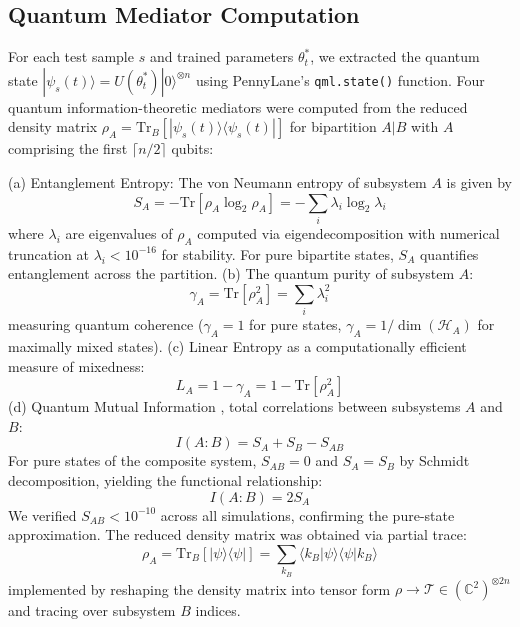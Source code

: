 \documentclass[
    reprint,
    amsmath, amssymb,
    aps,
    floatfix,
    nofootinbib
]{revtex4-1}
\begin{document}
\subsection*{Quantum Mediator Computation}

For each test sample $s$ and trained parameters $\theta_t^*$, we extracted the quantum state $|\psi_s(t)\rangle = U(\theta_t^*)|0\rangle^{\otimes n}$ using PennyLane's \texttt{qml.state()} function. Four quantum information-theoretic mediators were computed from the reduced density matrix $\rho_A = \text{Tr}_B[|\psi_s(t)\rangle\langle\psi_s(t)|]$ for bipartition $A|B$ with $A$ comprising the first $\lceil n/2 \rceil$ qubits:

(a) Entanglement Entropy: The von Neumann entropy of subsystem $A$ is given by 
\begin{equation}
S_A = -\text{Tr}[\rho_A \log_2 \rho_A] = -\sum_i \lambda_i \log_2 \lambda_i
\end{equation}
where $\lambda_i$ are eigenvalues of $\rho_A$ computed via eigendecomposition with numerical truncation at $\lambda_i < 10^{-16}$ for stability. For pure bipartite states, $S_A$ quantifies entanglement across the partition.
(b) The quantum purity of subsystem $A$:
\begin{equation}
\gamma_A = \text{Tr}[\rho_A^2] = \sum_i \lambda_i^2
\end{equation}
measuring quantum coherence ($\gamma_A = 1$ for pure states, $\gamma_A = 1/\dim(\mathcal{H}_A)$ for maximally mixed states).
(c) Linear Entropy as a computationally efficient measure of mixedness:
\begin{equation}
L_A = 1 - \gamma_A = 1 - \text{Tr}[\rho_A^2]
\end{equation}
(d) Quantum Mutual Information
, total correlations between subsystems $A$ and $B$:
\begin{equation}
I(A:B) = S_A + S_B - S_{AB}
\end{equation}
For pure states of the composite system, $S_{AB} = 0$ and $S_A = S_B$ by Schmidt decomposition, yielding the functional relationship:
\begin{equation}
I(A:B) = 2S_A
\label{eq:mutual_info_pure}
\end{equation}
We verified $S_{AB} < 10^{-10}$ across all simulations, confirming the pure-state approximation. The reduced density matrix was obtained via partial trace:
\begin{equation}
\rho_A = \text{Tr}_B[|\psi\rangle\langle\psi|] = \sum_{k_B} \langle k_B | \psi \rangle \langle \psi | k_B \rangle
\end{equation}
implemented by reshaping the density matrix into tensor form $\rho \rightarrow \mathcal{T} \in (\mathbb{C}^2)^{\otimes 2n}$ and tracing over subsystem $B$ indices.
\end{document}
